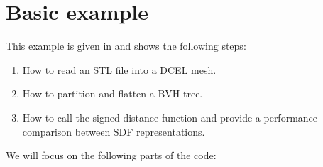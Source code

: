 \documentclass[letterpaper,10pt,english]{sphinxmanual}
\begin{document}
\sphinxstepscope


\section{Basic example}
\label{\detokenize{Example_Basic:basic-example}}\label{\detokenize{Example_Basic:chap-examplestl}}\label{\detokenize{Example_Basic::doc}}
\sphinxAtStartPar
This example is given in  and shows the following steps:
\begin{enumerate}
%
\item {} 
\sphinxAtStartPar
How to read an STL file into a DCEL mesh.

\item {} 
\sphinxAtStartPar
How to partition and flatten a BVH tree.

\item {} 
\sphinxAtStartPar
How to call the signed distance function and provide a performance comparison between SDF representations.

\end{enumerate}

\sphinxAtStartPar
We will focus on the following parts of the code:
\end{document}
